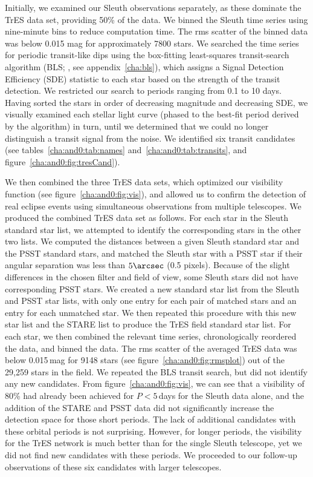 Initially, we examined our Sleuth observations separately, as these dominate the TrES data set, providing 50\% of the data. We binned the Sleuth time series using nine-minute bins to reduce computation time. The rms scatter of the binned data was below 0.015 mag for approximately 7800 stars. We searched the time series for periodic transit-like dips using the box-fitting least-squares transit-search algorithm (BLS; \citealt*{Kovacs_Zucker_Mazeh:aa:2002a}, see appendix~\ref{cha:bls}), which assigns a Signal Detection Efficiency (SDE) statistic to each star based on the strength of the transit detection. We restricted our search to periods ranging from 0.1 to 10 days. Having sorted the stars in order of decreasing magnitude and decreasing SDE, we visually examined each stellar light curve (phased to the best-fit period derived by the algorithm) in turn, until we determined that we could no longer distinguish a transit signal from the noise. We identified six transit candidates (see tables~\ref{cha:and0:tab:names} and~\ref{cha:and0:tab:transits}, and figure~\ref{cha:and0:fig:tresCand}).

We then combined the three TrES data sets, which optimized our visibility function (see figure~\ref{cha:and0:fig:vis}), and allowed us to confirm the detection of real eclipse events using simultaneous observations from multiple telescopes. We produced the combined TrES data set as follows. For each star in the Sleuth standard star list, we attempted to identify the corresponding stars in the other two lists. We computed the distances between a given Sleuth standard star and the PSST standard stars, and matched the Sleuth star with a PSST star if their angular separation was less than $5\arcsec$ (0.5 pixels). Because of the slight differences in the chosen filter and field of view, some Sleuth stars did not have corresponding PSST stars. We created a new standard star list from the Sleuth and PSST star lists, with only one entry for each pair of matched stars and an entry for each unmatched star. We then repeated this procedure with this new star list and the STARE list to produce the TrES field standard star list. For each star, we then combined the relevant time series, chronologically reordered the data, and binned the data. The rms scatter of the averaged TrES data was below 0.015\,mag for 9148 stars (see figure~\ref{cha:and0:fig:rmsplot}) out of the 29,259 stars in the field. We repeated the BLS transit search, but did not identify any new candidates. From figure~\ref{cha:and0:fig:vis}, we can see that a visibility of 80\% had already been achieved for $P<5$\,days for the Sleuth data alone, and the addition of the STARE and PSST data did not significantly increase the detection space for those short periods. The lack of additional candidates with these orbital periods is not surprising. However, for longer periods, the visibility for the TrES network is much better than for the single Sleuth telescope, yet we did not find new candidates with these periods. We proceeded to our follow-up observations of these six candidates with larger telescopes. 

